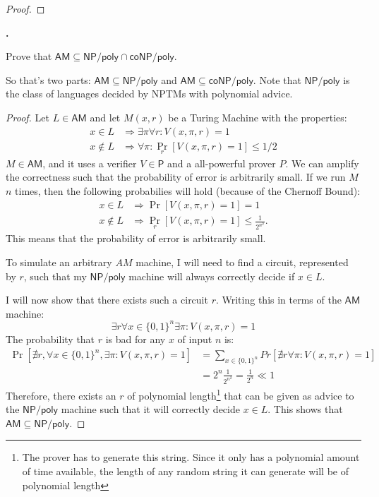 \documentclass[letterpaper,11pt]{article}
\newcommand{\cc}[1]{\ensuremath{\textsf{#1}}\xspace}
\renewcommand{\P}{\cc{P}}
\newcommand{\NP}{\cc{NP}}
\newcommand{\coNP}{\cc{coNP}}
\newcommand{\AM}{\cc{AM}}
\newcounter{problem}
\newenvironment{problem}%
{%
	\stepcounter{problem}%
	\textbf{\theproblem.}
	\large
}{\\}%
\newcommand{\tm}{Turing Machine}
\newcommand{\NPpoly}{\NP/\textsf{poly}}
\begin{document}
\begin{proof}
\end{proof}


\begin{problem}
Prove that $\AM \subseteq \NP/\textsf{poly} \cap \coNP/\textsf{poly}$. 

So that's two parts: $\AM \subseteq \NP/\textsf{poly}$ and $\AM \subseteq \coNP/\textsf{poly}$. 
Note that $\NP/\textsf{poly}$ is the class of languages decided by NPTMs with polynomial advice. 
\end{problem}

\begin{proof}
Let $L \in \AM$ and let $M(x,r)$ be a \tm{} with the properties:
\begin{align*}
	x \in L &\Rightarrow \exists \pi \forall r : V(x,\pi,r) = 1 \\
	x \not \in L &\Rightarrow \forall \pi  : \underset{r}{\Pr}[V(x,\pi,r) =1] \leq 1/2
\end{align*}
$M \in \AM$, and it uses a verifier $V \in \P$ and a all-powerful prover $P$.
We can amplify the correctness such that the probability of error is arbitrarily small.
If we run $M$ $n$ times, then the following probabilies will hold (because of the Chernoff Bound):
\begin{align*}
	x \in L &\Rightarrow \Pr[V(x,\pi,r) =1] = 1 \\
	x \not \in L &\Rightarrow \underset{r}{\Pr}[V(x,\pi,r) = 1] \leq \frac{1}{2^{n^2}}.
\end{align*}
This means that the probability of error is arbitrarily small.

To simulate an arbitrary $AM$ machine, I will need to find a circuit, represented by $r$, such that my $\NPpoly$ machine will always correctly decide if $x \in L$.

I will now show that there exists such a circuit $r$.
Writing this in terms of the $\AM$ machine:
\[
	\exists r \forall x \in \{0,1\}^n \exists{\pi}: V(x,\pi,r) = 1
\]
The probability that $r$ is bad for any $x$ of input $n$ is:
\begin{align*}
	\Pr[\nexists r, \forall x \in \{0,1\}^n, \exists \pi: V(x,\pi,r) = 1] &= \sum_{x \in \{0,1\}^n} Pr[\nexists r \forall \pi: V(x,\pi,r) = 1] \\
	&= 2^n \frac{1}{2^{n^2}} = \frac{1}{2^n} \ll 1
\end{align*}
Therefore, there exists an $r$ of polynomial length\footnote{The prover has to generate this string. Since it only has a polynomial amount of time available, the length of any random string it can generate will be of polynomial length} that can be given as advice to the $\NPpoly$ machine such that it will correctly decide $x \in L$.
This shows that $\AM \subseteq \NPpoly$.


\end{proof}
\end{document}
